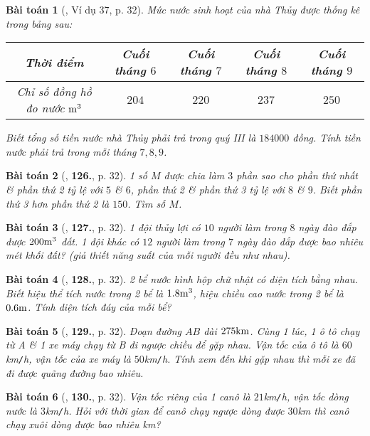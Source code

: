 \documentclass{article}
\numberwithin{equation}{section}
\newtheorem{baitoan}{Bài toán}
\begin{document}
\begin{baitoan}[\cite{Tuyen_Toan_7}, Ví dụ 37, p. 32]
	Mức nước sinh hoạt của nhà Thủy được thống kê trong bảng sau:
	
	\begin{table}[H]
		\centering
		\begin{tabular}{|c|c|c|c|c|}
			\hline
			Thời điểm & Cuối tháng $6$ & Cuối tháng $7$ & Cuối tháng $8$ & Cuối tháng $9$ \\
			\hline
			Chỉ số đồng hồ đo nước $\rm m^3$ & $204$ & $220$ & $237$ & $250$ \\
			\hline
		\end{tabular}
	\end{table}
	Biết tổng số tiền nước nhà Thủy phải trả trong quý III là $184000$ đồng. Tính tiền nước phải trả trong mỗi tháng $7,8,9$.
\end{baitoan}

\begin{baitoan}[\cite{Tuyen_Toan_7}, \textbf{126.}, p. 32]
	1 số $M$ được chia làm $3$ phần sao cho phần thứ nhất \& phần thứ 2 tỷ lệ với $5$ \& $6$, phần thứ 2 \& phần thứ 3 tỷ lệ với $8$ \& $9$. Biết phần thứ 3 hơn phần thứ 2 là $150$. Tìm số $M$.
\end{baitoan}
	
\begin{baitoan}[\cite{Tuyen_Toan_7}, \textbf{127.}, p. 32]
	1 đội thủy lợi có $10$ người làm trong $8$ ngày đào đắp được $\rm200m^3$ đất. 1 đội khác có $12$ người làm trong $7$ ngày đào đắp được bao nhiêu mét khối đất? (giả thiết năng suất của mỗi người đều như nhau).
\end{baitoan}

\begin{baitoan}[\cite{Tuyen_Toan_7}, \textbf{128.}, p. 32]
	2 bể nước hình hộp chữ nhật có diện tích bằng nhau. Biết hiệu thể tích nước trong 2 bể là $\rm1.8m^3$, hiệu chiều cao nước trong 2 bể là $\rm0.6m$. Tính diện tích đáy của mỗi bể?
\end{baitoan}

\begin{baitoan}[\cite{Tuyen_Toan_7}, \textbf{129.}, p. 32]
	Đoạn đường $AB$ dài $\rm275km$. Cùng 1 lúc, 1 ô tô chạy từ A \& 1 xe máy chạy từ B đi ngược chiều để gặp nhau. Vận tốc của ô tô là $60$\emph{km\texttt{/}h}, vận tốc của xe máy là $50$\emph{km\texttt{/}h}. Tính xem đến khi gặp nhau thì mỗi xe đã đi được quãng đường bao nhiêu.
\end{baitoan}

\begin{baitoan}[\cite{Tuyen_Toan_7}, \textbf{130.}, p. 32]
	Vận tốc riêng của 1 canô là $21$\emph{km\texttt{/}h}, vận tốc dòng nước là $3$\emph{km\texttt{/}h}. Hỏi với thời gian để canô chạy ngược dòng được $30$\emph{km} thì canô chạy xuôi dòng được bao nhiêu \emph{km}?
\end{baitoan}
\end{document}
